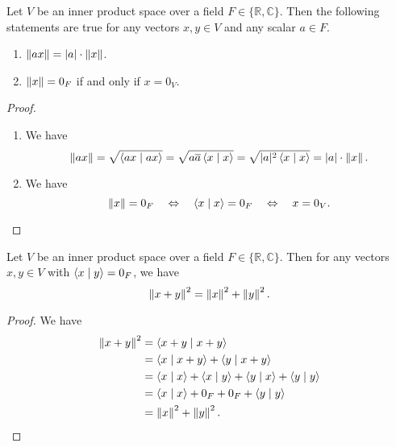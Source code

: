 \begin{proposition}
  Let $V$ be an inner product space over a field
  $F \in \{\mathbb{R}, \mathbb{C}\}$.
  Then the following statements are true for any vectors $x, y \in V$ and any
  scalar $a \in F$.
  \begin{enumerate}
    \item $\left\Vert ax \right\Vert = |a| \cdot \left\Vert x \right\Vert$.
    \item $\left\Vert x \right\Vert = 0_F$ if and only if $x = 0_V$.
  \end{enumerate}
\end{proposition}
\begin{proof}
  \leavevmode
  \begin{enumerate}
    \item We have
    \begin{equation*}
      \left\Vert ax \right\Vert
      = \sqrt{\left\langle ax \; \middle| \; ax \right\rangle}
      = \sqrt{a\overline{a}\left\langle x \; \middle| \; x \right\rangle}
      = \sqrt{|a|^2 \left\langle x \; \middle| \; x \right\rangle}
      = |a| \cdot \left\Vert x \right\Vert.
    \end{equation*}

    \item We have
    \begin{equation*}
      \left\Vert x \right\Vert = 0_F
      \quad \Leftrightarrow \quad
      \left\langle x \; \middle| \; x \right\rangle = 0_F
      \quad \Leftrightarrow \quad
      x = 0_V.
    \end{equation*}
  \end{enumerate}
\end{proof}

\begin{theorem}
  \label{thm:pythagoras}
  Let $V$ be an inner product space over a field
  $F \in \{\mathbb{R}, \mathbb{C}\}$.
  Then for any vectors $x, y \in V$ with $\left\langle x \; \middle| \; y \right\rangle = 0_F$, we have
  \begin{equation*}
    \left\Vert x + y \right\Vert^2 = \left\Vert x \right\Vert^2 + \left\Vert y \right\Vert^2.
  \end{equation*}
\end{theorem}
\begin{proof}
  We have
  \begin{align*}
    \left\Vert x + y \right\Vert^2
    &= \left\langle x + y \; \middle| \; x + y \right\rangle \\
    &= \left\langle x \; \middle| \; x + y \right\rangle + \left\langle y \; \middle| \; x + y \right\rangle \\
    &= \left\langle x \; \middle| \; x \right\rangle + \left\langle x \; \middle| \; y \right\rangle + \left\langle y \; \middle| \; x \right\rangle + \left\langle y \; \middle| \; y \right\rangle \\
    &= \left\langle x \; \middle| \; x \right\rangle + 0_F + 0_F + \left\langle y \; \middle| \; y \right\rangle \\
    &= \left\Vert x \right\Vert^2 + \left\Vert y \right\Vert^2.
    \qedhere
  \end{align*}
\end{proof}

